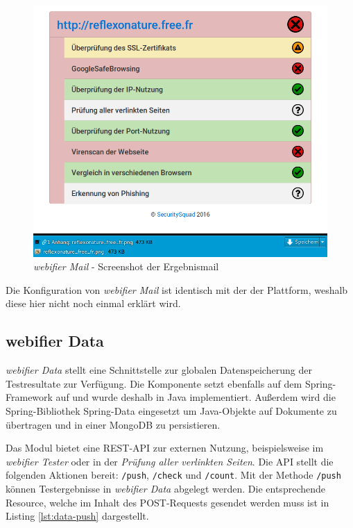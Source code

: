 \begin{figure}[H]
	\centering
	\includegraphics[width=15cm]{images/mail-result.png}
	\caption{\textit{webifier Mail} - Screenshot der Ergebnismail}
	\label{fig:mail-result}
\end{figure}

Die Konfiguration von \textit{webifier Mail} ist identisch mit der der Plattform, weshalb diese
hier nicht noch einmal erklärt wird.

\subsection{webifier Data}
\label{sec:umsetzung-data}

\textit{webifier Data} stellt eine Schnittstelle zur globalen Datenspeicherung der Testresultate zur
Verfügung. Die Komponente setzt ebenfalls auf dem Spring-Framework auf und wurde deshalb in Java implementiert. Außerdem wird die Spring-Bibliothek Spring-Data eingesetzt um Java-Objekte auf Dokumente zu übertragen und in einer MongoDB zu persistieren.

Das Modul bietet eine \ac{REST}-\ac{API} zur externen Nutzung, beispielsweise im \textit{webifier
Tester} oder in der \textit{Prüfung aller verlinkten Seiten}. Die API stellt die folgenden Aktionen
bereit:
\lstinline[style=eclipse]{/push}, \lstinline[style=eclipse]{/check} und
\lstinline[style=eclipse]{/count}. Mit der Methode \lstinline[style=eclipse]{/push} können
Testergebnisse in \textit{webifier Data} abgelegt werden. Die entsprechende Resource, welche im Inhalt des POST-Requests gesendet werden muss ist in Listing \ref{lst:data-push} dargestellt.

